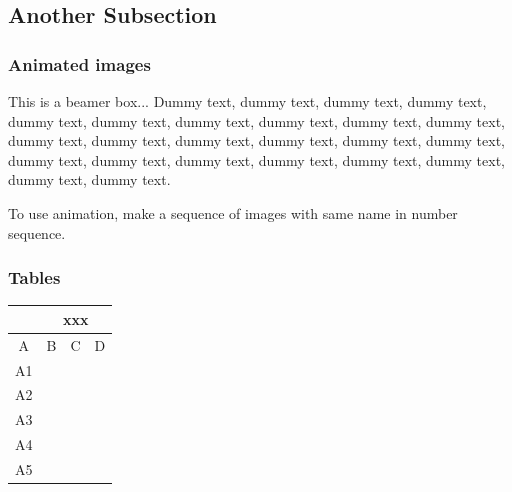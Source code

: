 \documentclass[hyperref={pdfpagelabels=false}]{beamer}
\begin{document}
\subsection{Another Subsection}
\frame
{
  \frametitle{Animated images}
  \begin{beamerboxesrounded}[lower=date in head/foot,shadow=true]{}
    This is a beamer box... \cite{article:dummy}
    Dummy text, dummy text, dummy text, dummy text, dummy text, dummy text, 
    dummy text, dummy text, dummy text, dummy text, dummy text, dummy text, 
    dummy text, dummy text, dummy text, dummy text, dummy text, dummy text, 
    dummy text, dummy text, dummy text, dummy text, dummy text, dummy text.
  \end{beamerboxesrounded}

    To use animation, make a sequence of images with same name in number sequence.
    \begin{center}
    \end{center} 
}
\frame
{
  \frametitle{Tables}
  \begin{table}
   \begin{tabular}{c|c|c|c|}
      \cline{2-4}& \multicolumn{3}{c|}{xxx}\\ \hline
      \multicolumn{1}{|c|}{A} & B & C & D \\ \hline
      \multicolumn{1}{|c|}{A1} & & & \\ \hline
      \multicolumn{1}{|c|}{A2} & & & \\ \hline
      \multicolumn{1}{|c|}{A3} & & & \\ \hline
      \multicolumn{1}{|c|}{A4} & & & \\ \hline
      \multicolumn{1}{|c|}{A5} & & & \\ \hline
    \end{tabular}
  \end{table}
}
\tiny
\end{document}
